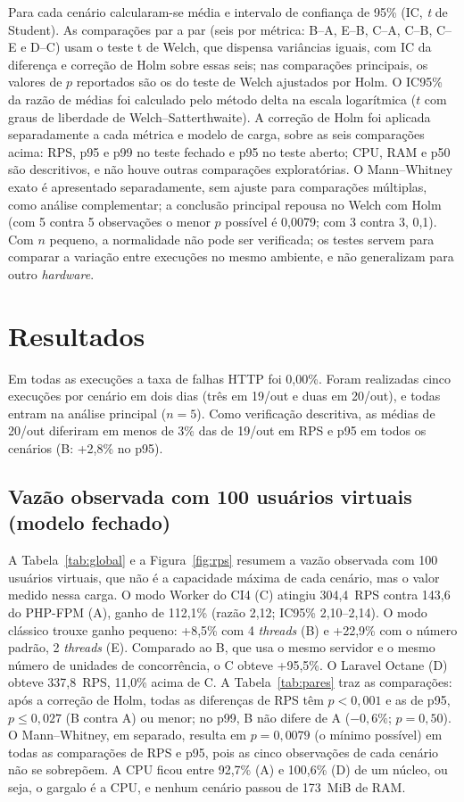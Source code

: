 \documentclass[sigconf, nonacm, screen, anonymous, language=portuguese, language=spanish, language={main=english}]{acmart}
\begin{document}
Para cada cenário calcularam-se média e intervalo de confiança de 95\% (IC, \textit{t} de Student). As comparações par a par (seis por métrica: B--A, E--B, C--A, C--B, C--E e D--C) usam o teste t de Welch, que dispensa variâncias iguais, com IC da diferença e correção de Holm sobre essas seis; nas comparações principais, os valores de $p$ reportados são os do teste de Welch ajustados por Holm. O IC95\% da razão de médias foi calculado pelo método delta na escala logarítmica ($t$ com graus de liberdade de Welch--Satterthwaite). A correção de Holm foi aplicada separadamente a cada métrica e modelo de carga, sobre as seis comparações acima: RPS, p95 e p99 no teste fechado e p95 no teste aberto; CPU, RAM e p50 são descritivos, e não houve outras comparações exploratórias. O Mann--Whitney exato é apresentado separadamente, sem ajuste para comparações múltiplas, como análise complementar; a conclusão principal repousa no Welch com Holm (com 5 contra 5 observações o menor $p$ possível é 0,0079; com 3 contra 3, 0,1). Com $n$ pequeno, a normalidade não pode ser verificada; os testes servem para comparar a variação entre execuções no mesmo ambiente, e não generalizam para outro \textit{hardware}.

\section{Resultados}
Em todas as execuções a taxa de falhas HTTP foi 0,00\%. Foram realizadas cinco execuções por cenário em dois dias (três em 19/out e duas em 20/out), e todas entram na análise principal ($n=5$). Como verificação descritiva, as médias de 20/out diferiram em menos de 3\% das de 19/out em RPS e p95 em todos os cenários (B: +2,8\% no p95).

\subsection{Vazão observada com 100 usuários virtuais (modelo fechado)}
A Tabela~\ref{tab:global} e a Figura~\ref{fig:rps} resumem a vazão observada com 100 usuários virtuais, que não é a capacidade máxima de cada cenário, mas o valor medido nessa carga. O modo Worker do CI4 (C) atingiu 304,4~RPS contra 143,6 do PHP-FPM (A), ganho de 112,1\% (razão 2,12; IC95\% 2,10--2,14). O modo clássico trouxe ganho pequeno: +8,5\% com 4 \textit{threads} (B) e +22,9\% com o número padrão, 2 \textit{threads} (E). Comparado ao B, que usa o mesmo servidor e o mesmo número de unidades de concorrência, o C obteve +95,5\%. O Laravel Octane (D) obteve 337,8~RPS, 11,0\% acima de C. A Tabela~\ref{tab:pares} traz as comparações: após a correção de Holm, todas as diferenças de RPS têm $p<0{,}001$ e as de p95, $p\le0{,}027$ (B contra A) ou menor; no p99, B não difere de A ($-0{,}6\%$; $p=0{,}50$). O Mann--Whitney, em separado, resulta em $p=0{,}0079$ (o mínimo possível) em todas as comparações de RPS e p95, pois as cinco observações de cada cenário não se sobrepõem. A CPU ficou entre 92,7\% (A) e 100,6\% (D) de um núcleo, ou seja, o gargalo é a CPU, e nenhum cenário passou de 173~MiB de RAM.
\end{document}
